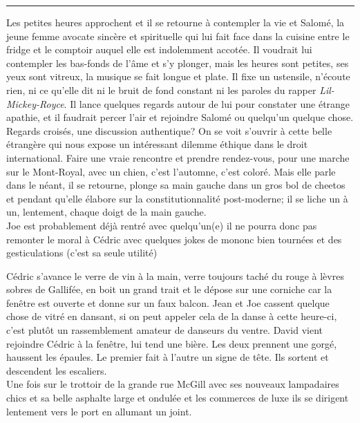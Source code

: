 \begin{center}\noindent\rule{0.5\textwidth}{0.4pt}\end{center} Les petites
heures approchent et il se retourne à contempler la vie et Salomé, la jeune
femme avocate sincère et spirituelle qui lui fait face dans la cuisine entre le
fridge et le comptoir auquel elle est indolemment accotée. Il voudrait lui
contempler les bas-fonds de l'âme et s'y plonger, mais les heures sont petites,
ses yeux sont vitreux, la musique se fait longue et plate.  Il fixe un
ustensile, n'écoute rien, ni ce qu'elle dit ni le bruit
de fond constant ni les paroles du rapper \textit{Lil-Mickey-Royce}. Il lance
quelques regards autour de lui pour constater une étrange apathie, et il
faudrait percer l'air et rejoindre Salomé ou quelqu'un quelque chose.
Regards croisés, une discussion authentique? On se voit s'ouvrir à cette
belle étrangère qui nous expose un intéressant dilemme éthique dans le droit
international. Faire une vraie rencontre et prendre rendez-vous, pour une
marche sur le Mont-Royal, avec un chien, c'est l'automne, c'est coloré. Mais
elle parle dans le néant, il se retourne,
plonge sa main gauche dans un gros bol de
cheetos et pendant qu'elle élabore sur la constitutionnalité post-moderne;
il se liche un à un, lentement, chaque doigt de la main gauche. \\


Joe est probablement déjà rentré avec quelqu'un(e) il ne pourra donc pas
remonter le moral à Cédric avec quelques jokes de mononc bien tournées et des
gesticulations (c'est sa seule utilité)

Cédric s'avance le verre de vin à la main, verre toujours
taché du rouge à lèvres sobres de Gallifée, en boit un grand trait et le dépose sur
une corniche car la fenêtre est ouverte et donne sur un faux balcon. Jean et Joe
cassent quelque chose de vitré en dansant, si on peut appeler cela de
la danse à cette heure-ci, c'est plutôt un rassemblement amateur de danseurs
du ventre. David vient rejoindre Cédric à la fenêtre, lui tend une bière.
Les deux prennent une gorgé, haussent les épaules. Le premier fait à l'autre un
signe de tête. Ils sortent et descendent les escaliers.\\

Une fois
sur le trottoir de la grande
rue McGill avec ses nouveaux lampadaires chics et sa belle asphalte large et
ondulée et les commerces de luxe ils se dirigent lentement vers le port en
allumant un joint. 

